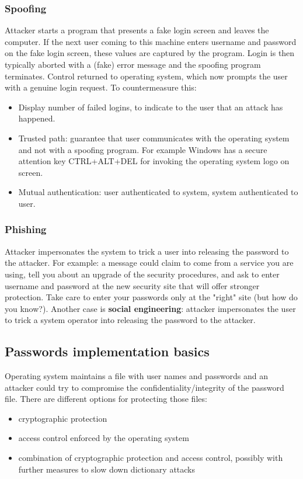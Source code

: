 \documentclass[a4paper, 10pt, titlepage]{article}
\begin{document}
\subsubsection*{Spoofing}
Attacker starts a program that presents a fake login screen and leaves the computer. If the next user coming to this machine enters username and password on the fake login screen, these values are captured by the program. Login is then typically aborted with a (fake) error message and the spoofing program terminates. Control returned to operating system, which now prompts the user with a genuine login request. 
To countermeasure this:
\begin{itemize}
\item Display number of failed logins, to indicate to the user that an attack has happened.
\item Trusted path: guarantee that user communicates with the operating system and not with a spoofing program. For example Windows has a secure attention key CTRL+ALT+DEL for invoking the operating system logo on screen.
\item Mutual authentication: user authenticated to system, system authenticated to user.
\end{itemize}

\subsubsection*{Phishing}
Attacker impersonates the system to trick a user into releasing the password to the attacker. For example: a message could claim to come from a service you are using, tell you about an upgrade of the security procedures, and ask to enter username and password at the new security site that will offer stronger protection.
Take care to enter your passwords only at the "right" site (but how do you know?). Another case is \textbf{social engineering}: attacker impersonates the user to trick a system operator into releasing the password to the attacker.

\subsection{Passwords implementation basics}
Operating system maintains a file with user names and passwords and an attacker could try to compromise the confidentiality/integrity of the password file. There are different options for protecting those files:
\begin{itemize}
\item cryptographic protection
\item access control enforced by the operating system
\item combination of cryptographic protection and access control, possibly with further measures to slow down dictionary attacks
\end{itemize}
\end{document}
